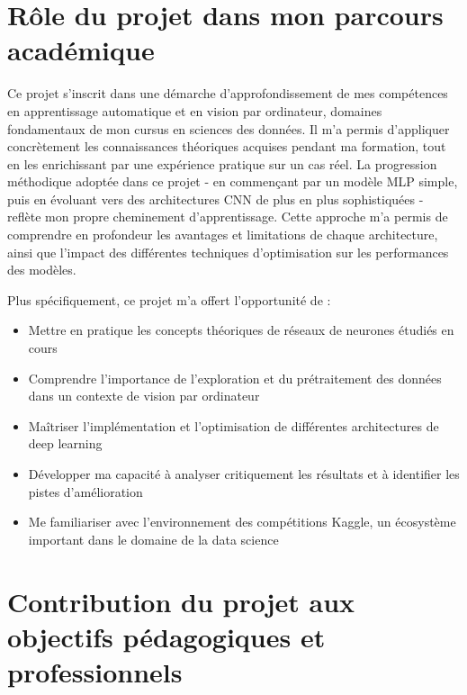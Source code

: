\section{Rôle du projet dans mon parcours académique}

\begin{flushleft}
Ce projet s'inscrit dans une démarche d'approfondissement de mes compétences en apprentissage automatique et en vision par ordinateur, domaines fondamentaux de mon cursus en sciences des données. Il m'a permis d'appliquer concrètement les connaissances théoriques acquises pendant ma formation, tout en les enrichissant par une expérience pratique sur un cas réel.
\bigskip
La progression méthodique adoptée dans ce projet - en commençant par un modèle MLP simple, puis en évoluant vers des architectures CNN de plus en plus sophistiquées - reflète mon propre cheminement d'apprentissage. Cette approche m'a permis de comprendre en profondeur les avantages et limitations de chaque architecture, ainsi que l'impact des différentes techniques d'optimisation sur les performances des modèles.

\bigskip
Plus spécifiquement, ce projet m'a offert l'opportunité de :
\bigskip

\begin{itemize}
\item Mettre en pratique les concepts théoriques de réseaux de neurones étudiés en cours
\item Comprendre l'importance de l'exploration et du prétraitement des données dans un contexte de vision par ordinateur
\item Maîtriser l'implémentation et l'optimisation de différentes architectures de deep learning
\item Développer ma capacité à analyser critiquement les résultats et à identifier les pistes d'amélioration
\item Me familiariser avec l'environnement des compétitions Kaggle, un écosystème important dans le domaine de la data science
\end{itemize}
\end{flushleft}

\section{Contribution du projet aux objectifs pédagogiques et professionnels}

